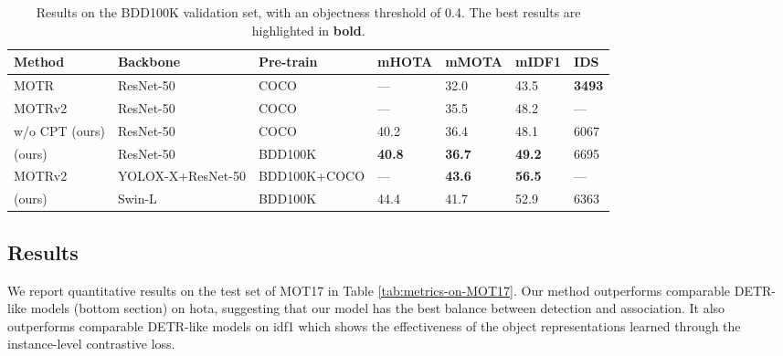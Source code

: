\begin{table*}[t]
\centering \footnotesize
\begin{tabular}{lllllll}
\toprule
Method                                       & Backbone  & Pre-train & mHOTA & mMOTA & mIDF1 & IDS \\ \midrule               
MOTR \cite{zeng2022motr}        & ResNet-50 & COCO      & ---             & 32.0            & 43.5            & \textbf{3493}   \\
MOTRv2 \cite{Zhang_2023_CVPR}   & ResNet-50 & COCO      & ---             & 35.5            & 48.2            & ---  \\
\textbf{\ourmodelname{}} w/o CPT (ours)  & ResNet-50 & COCO      & 40.2            & 36.4            & 48.1            & 6067  \\ 
\textbf{\ourmodelname{}} (ours)          & ResNet-50 & BDD100K & \textbf{40.8} & \textbf{36.7} & \textbf{49.2} &  6695 \\ \midrule 
MOTRv2 \cite{Zhang_2023_CVPR}   & YOLOX-X+ResNet-50 & BDD100K+COCO & ---       & \textbf{43.6}     & \textbf{56.5}            & ---  \\ 
\textbf{\ourmodelname{}} (ours)          & Swin-L & BDD100K   & 44.4   & 41.7   & 52.9   & 6363            \\ 
\bottomrule
\end{tabular}
\caption{Results on the BDD100K validation set, with an objectness threshold of 0.4. The best results are highlighted in \textbf{bold}. } 
\label{tab:metrics-on-BDD100K-val}
\vspace{-1.4em}
\end{table*}

\subsection{Results}

 We report quantitative results on the test set of MOT17 in Table \ref{tab:metrics-on-MOT17}. Our method outperforms comparable DETR-like models (bottom section) on \ac{hota}, suggesting that our model has the best balance between detection and association. It also outperforms comparable DETR-like models on \ac{idf1} which shows the effectiveness of the object representations learned through the instance-level contrastive loss. 

